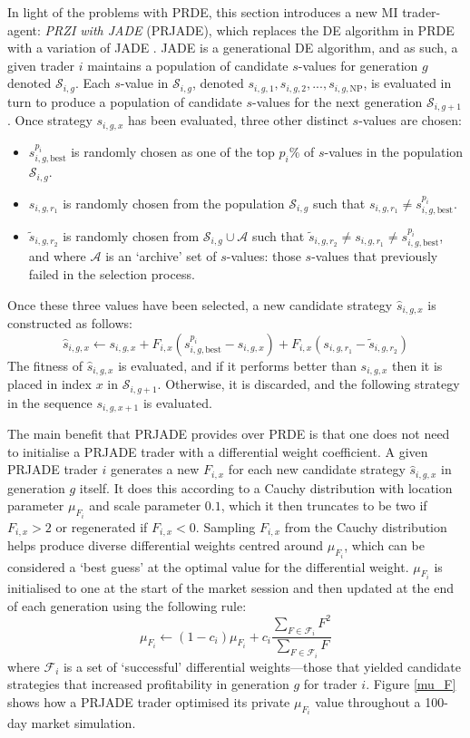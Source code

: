 \documentclass[conference]{IEEEtran}
\begin{document}
In light of the problems with PRDE, this section introduces a new MI trader-agent: \textit{PRZI with JADE} (PRJADE), which replaces the DE algorithm in PRDE with a variation of JADE \cite{ZhangSanderson}.
JADE is a generational DE algorithm, and as such, a given trader $i$ maintains a population of candidate $s$-values for generation $g$ denoted $\mathcal{S}_{i,g}$.
Each $s$-value in $\mathcal{S}_{i,g}$, denoted $s_{i,g,1}, s_{i,g,2}, ..., s_{i,g,\mathrm{NP}}$, is evaluated in turn to produce a population of candidate $s$-values for the next generation $\mathcal{S}_{i,g+1}$.
Once strategy $s_{i,g,x}$ has been evaluated, three other distinct $s$-values are chosen:
\begin{itemize}
    \item $s^{p_i}_{i,g,\text{best}}$ is randomly chosen as one of the top $p_i\%$ of $s$-values in the population $\mathcal{S}_{i,g}$.
    \item $s_{i,g,r_1}$ is randomly chosen from the population $\mathcal{S}_{i,g}$ such that $s_{i,g,r_1}\ne s^{p_i}_{i,g,\text{best}}$.
    \item $\tilde{s}_{i,g,r_2}$ is randomly chosen from $\mathcal{S}_{i,g}\cup\mathcal{A}$ such that $\tilde{s}_{i,g,r_2}\ne s_{i,g,r_1}\ne s^{p_i}_{i,g,\text{best}}$, and where $\mathcal{A}$ is an `archive' set of $s$-values: those $s$-values that previously failed in the selection process.
\end{itemize}

Once these three values have been selected, a new candidate strategy $\hat{s}_{i,g,x}$ is constructed as follows:
\[
    \hat{s}_{i,g,x}\leftarrow s_{i,g,x}+F_{i,x}\left(s^{p_i}_{i,g,\text{best}} - s_{i,g,x}\right) + F_{i,x}\left(s_{i,g,r_1} - \tilde{s}_{i,g,r_2}\right)
\]
The fitness of $\hat{s}_{i,g,x}$ is evaluated, and if it performs better than $s_{i,g,x}$ then it is placed in index $x$ in $\mathcal{S}_{i,g+1}$. 
Otherwise, it is discarded, and the following strategy in the sequence $s_{i,g,x+1}$ is evaluated.

The main benefit that PRJADE provides over PRDE is that one does not need to initialise a PRJADE trader with a differential weight coefficient.
A given PRJADE trader $i$ generates a new $F_{i,x}$ for each new candidate strategy $\hat{s}_{i,g,x}$ in generation $g$ itself.
It does this according to a Cauchy distribution with location parameter $\mu_{F_i}$ and scale parameter $0.1$, which it then truncates to be two if $F_{i,x}>2$ or regenerated if $F_{i,x}<0$.
Sampling $F_{i,x}$ from the Cauchy distribution helps produce diverse differential weights centred around $\mu_{F_i}$, which can be considered a `best guess' at the optimal value for the differential weight.
$\mu_{F_i}$ is initialised to one at the start of the market session and then updated at the end of each generation using the following rule:
\[
    \mu_{F_i}\leftarrow (1-c_i)\mu_{F_i} + c_i\frac{\sum_{F\in \mathcal{F}_i} F^2}{\sum_{F\in\mathcal{F}_i} F}
\]
where $\mathcal{F}_i$ is a set of `successful' differential weights---those that yielded candidate strategies that increased profitability in generation $g$ for trader $i$.
Figure \ref{mu_F} shows how a PRJADE trader optimised its private $\mu_{F_i}$ value throughout a 100-day market simulation.
\end{document}
